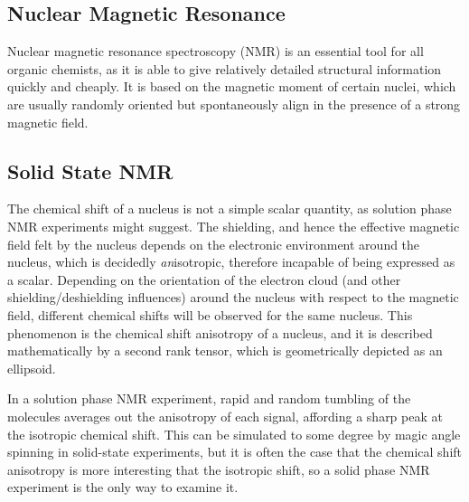 \begin{refsection}
\section{Nuclear Magnetic Resonance}
Nuclear magnetic resonance spectroscopy (NMR) is an essential tool for all organic chemists, as it is able to give relatively detailed structural information quickly and cheaply.
It is based on the magnetic moment of certain nuclei, which are usually randomly oriented but spontaneously align in the presence of a strong magnetic field.

\subsection{Solid State NMR}
The chemical shift of a nucleus is not a simple scalar quantity, as solution phase NMR experiments might suggest.
The shielding, and hence the effective magnetic field felt by the nucleus depends on the electronic environment around the nucleus, which is decidedly \emph{an}isotropic, therefore incapable of being expressed as a scalar.
Depending on the orientation of the electron cloud (and other shielding/deshielding influences) around the nucleus with respect to the magnetic field, different chemical shifts will be observed for the same nucleus.
This phenomenon is the chemical shift anisotropy of a nucleus, and it is described mathematically by a second rank tensor, which is geometrically depicted as an ellipsoid.

In a solution phase NMR experiment, rapid and random tumbling of the molecules averages out the anisotropy of each signal, affording a sharp peak at the isotropic chemical shift.
This can be simulated to some degree by magic angle spinning in solid-state experiments, but it is often the case that the chemical shift anisotropy is more interesting that the isotropic shift, so a solid phase NMR experiment is the only way to examine it.


\end{refsection}
